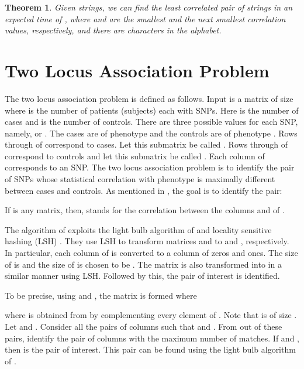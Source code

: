 \documentclass{article}
\newtheorem{theorem}{Theorem}[section]
\theoremstyle{definition}
\theoremstyle{remark}
\begin{document}
  \begin{theorem}
 Given  strings,  we can find the least correlated pair of strings in an expected time of \protect\linebreak \newline , where  and  are the smallest and the next smallest correlation values, respectively, and there are  characters in the alphabet. 
 \end{theorem}

\section{Two Locus Association Problem}\label{sec6}
The two locus association problem is defined as follows.
Input is a matrix  of size  where  is the number of patients (subjects) each with  SNPs. Here  is the number of cases and  is the number of controls. There are three possible values for each SNP, namely,  or .  The cases are of phenotype  and the controls are of phenotype . Rows  through  of  correspond to cases. Let this submatrix be called . Rows  through  of  correspond to controls and let this submatrix be called . Each column of  corresponds to an SNP.  The two locus association problem is to identify the pair of SNPs whose statistical correlation with phenotype is maximally different between cases and controls. As mentioned in \cite{PBK11}, the goal is to identify the pair:



If  is any matrix, then,  stands for the correlation between the columns  and  of .

The algorithm of \cite{PBK11} exploits the light bulb algorithm of \cite{RSJ89} and locality sensitive hashing (LSH) \cite{M02}. They use LSH to transform matrices  and  to  and , respectively. In particular, each column  of  is converted to a column  of zeros and ones. The size of  is  and the size of  is chosen to be . The matrix  is also transformed into  in a similar manner using LSH. Followed by this, the pair of interest is identified.

To be precise, using  and , the matrix  is formed where


where  is obtained from  by complementing every element of . Note that  is of size . Let  and . Consider all the pairs of columns  such that  and . From out of these pairs, identify the pair  of columns with the maximum number of matches.  If  and , then  is the pair of interest. This pair can be found using the light bulb algorithm of \cite{RSJ89}.
\end{document}
